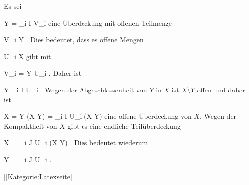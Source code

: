 Es sei

\mavergleichskettedisp
{\vergleichskette
{ Y
}
{ =} { \bigcup_{i \in I} V_i
}
{ } {
}
{ } {
}
{ } {
}
}
{}{}{}
eine Überdeckung mit offenen Teilmenge

\mavergleichskette
{\vergleichskette
{ V_i
}
{ \subseteq }{ Y
}
{  }{
}
{    }{
}
{   }{
}
}
{}{}{.}
Dies bedeutet, dass es offene Mengen

\mavergleichskette
{\vergleichskette
{ U_i
}
{ \subseteq }{ X
}
{  }{
}
{    }{
}
{   }{
}
}
{}{}{}
gibt mit

\mavergleichskette
{\vergleichskette
{ V_i
}
{ = }{ Y \cap U_i
}
{  }{
}
{    }{
}
{   }{
}
}
{}{}{.}
Daher ist

\mavergleichskettedisp
{\vergleichskette
{ Y
}
{ \subseteq} { \bigcup_{i \in I} U_i
}
{ } {
}
{ } {
}
{ } {
}
}
{}{}{.}
Wegen der Abgeschlossenheit von $Y$ in $X$ ist $X \setminus Y$ offen und daher ist

\mavergleichskettedisp
{\vergleichskette
{ X
}
{ =} { Y \cup (X \setminus Y)
}
{ =} { \bigcup_{i \in I} U_i  \cup  (X \setminus Y)
}
{ } {
}
{ } {
}
}
{}{}{}
eine offene Überdeckung von $X$. Wegen der Kompaktheit von $X$ gibt es eine endliche Teilüberdeckung

\mavergleichskettedisp
{\vergleichskette
{ X
}
{ =} { \bigcup_{i \in J} U_i  \cup  (X \setminus Y)
}
{ } {
}
{ } {
}
{ } {}
}
{}{}{.}
Dies bedeutet wiederum

\mavergleichskettedisp
{\vergleichskette
{ Y
}
{ =} { \bigcup_{i \in J} U_i
}
{ } {
}
{ } {
}
{ } {}
}
{}{}{.}

 [[Kategorie:Latexseite]]
